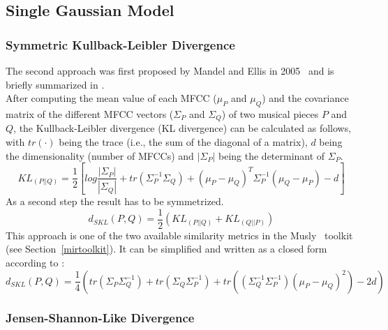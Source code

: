 \subsection{Single Gaussian Model}

\subsubsection{Symmetric Kullback-Leibler Divergence}\label{klth}

The second approach was first proposed by Mandel and Ellis in 2005~\cite{mandelellis1} and is briefly summarized in \cite[pp. 65f]{knees1}.\\
After computing the mean value of each MFCC ($\mu_P$ and $\mu_Q$) and the covariance matrix of the different MFCC vectors ($\Sigma_P$ and $\Sigma_Q$) of two musical pieces $P$ and $Q$, the Kullback-Leibler divergence (KL divergence) can be calculated as follows, with $tr(\cdot)$ being the trace (i.e., the sum of the diagonal of a matrix), $d$ being the dimensionality (number of MFCCs) and $|\Sigma_P|$ being the determinant of $\Sigma_P$.\\
\begin{equation} \label{eq:KL1}
KL_{(P||Q)} = \frac{1}{2}[log\frac{|\Sigma_P|}{|\Sigma_Q|} + tr(\Sigma_P^{-1}\Sigma_Q) + (\mu_P - \mu_Q)^T \Sigma_P^{-1} (\mu_Q - \mu_P) - d]
\end{equation}
As a second step the result has to be symmetrized.
\begin{equation} \label{eq:KL2}
d_{SKL}(P, Q) = \frac{1}{2} (KL_{(P||Q)} + KL_{(Q||P)}) 
\end{equation}
This approach is one of the two available similarity metrics in the Musly~\cite{musly1} toolkit (see Section~\ref{mirtoolkit}). It can be simplified and written as a closed form according to \cite[p. 44]{schnitzer1}:
\begin{equation} \label{eq:SKL}
d_{SKL}(P, Q) = \frac{1}{4} (tr(\Sigma_P\Sigma_Q^{-1}) + tr(\Sigma_Q\Sigma_P^{-1}) + tr((\Sigma_Q^{-1}\Sigma_P^{-1})(\mu_P - \mu_Q)^2) - 2d)
\end{equation}

\subsubsection{Jensen-Shannon-Like Divergence}

